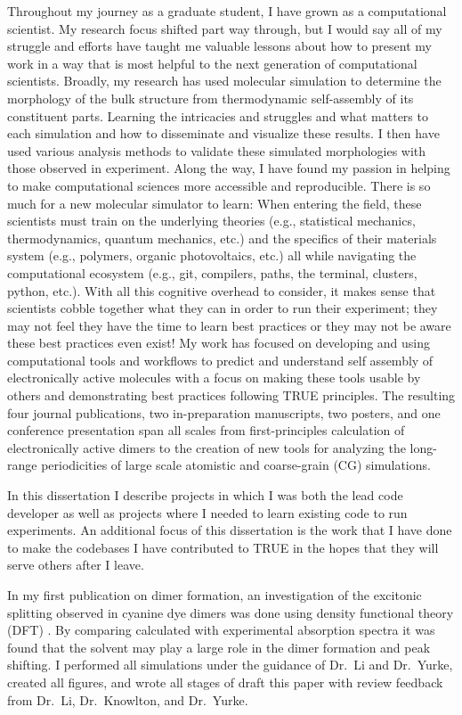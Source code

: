 Throughout my journey as a graduate student, I have grown as a computational scientist.
My research focus shifted part way through, but I would say all of my struggle and efforts have taught me valuable lessons about how to present my work in a way that is most helpful to the next generation of computational scientists.
Broadly, my research has used molecular simulation to determine the morphology of the bulk structure from thermodynamic self-assembly of its constituent parts. 
Learning the intricacies and struggles and what matters to each simulation and how to disseminate and visualize these results.
I then have used various analysis methods to validate these simulated morphologies with those observed in experiment. 
Along the way, I have found my passion in helping to make computational sciences more accessible and reproducible.
There is so much for a new molecular simulator to learn: When entering the field, these scientists must train on the underlying theories (e.g., statistical mechanics, thermodynamics, quantum mechanics, etc.) and the specifics of their materials system (e.g., polymers, organic photovoltaics, etc.) all while navigating the computational ecosystem (e.g., git, compilers, paths, the terminal, clusters, python, etc.).
With all this cognitive overhead to consider, it makes sense that scientists cobble together what they can in order to run their experiment; they may not feel they have the time to learn best practices or they may not be aware these best practices even exist!
My work has focused on developing and using computational tools and workflows to predict and understand self assembly of electronically active molecules with a focus on making these tools usable by others and demonstrating best practices following TRUE principles.
The resulting four journal publications, two in-preparation manuscripts, two posters, and one conference presentation span all scales from first-principles calculation of electronically active dimers to the creation of new tools for analyzing the long-range periodicities of large scale atomistic and coarse-grain (CG) simulations.

In this dissertation I describe projects in which I was both the lead code developer as well as projects where I needed to learn existing code to run experiments.
An additional focus of this dissertation is the work that I have done to make the codebases I have contributed to TRUE in the hopes that they will serve others after I leave.

In my first publication on dimer formation, an investigation of the excitonic splitting observed in cyanine dye dimers was done using density functional theory (DFT) \cite{Fothergill2018}.
By comparing calculated with experimental absorption spectra it was found that the solvent may play a large role in the dimer formation and peak shifting.
I performed all simulations under the guidance of Dr.~Li and Dr.~Yurke, created all figures, and wrote all stages of draft this paper with review feedback from Dr.~Li, Dr.~Knowlton, and Dr.~Yurke.

